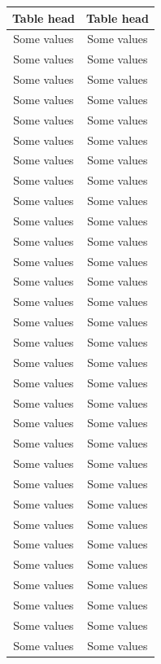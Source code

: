 \documentclass[11pt,a4paper]{article}
\begin{document}
\begin{minipage}{0.45\textwidth}
    \centering
    \begin{tabular}{cc}\hline
      Table head & Table head \\ \hline
        Some values & Some values \\
        Some values & Some values \\
        Some values & Some values \\
        Some values & Some values \\
        Some values & Some values \\
        Some values & Some values \\
        Some values & Some values \\
        Some values & Some values \\
        Some values & Some values \\
        Some values & Some values \\
        Some values & Some values \\
        Some values & Some values \\
        Some values & Some values \\
        Some values & Some values \\
        Some values & Some values \\
        Some values & Some values \\
        Some values & Some values \\
        Some values & Some values \\
        Some values & Some values \\
        Some values & Some values \\
        Some values & Some values \\
        Some values & Some values \\
        Some values & Some values \\
        Some values & Some values \\
        Some values & Some values \\
        Some values & Some values \\
        Some values & Some values \\
        Some values & Some values \\
        Some values & Some values \\
        Some values & Some values \\
        Some values & Some values \\

\end{tabular}
\end{minipage}
\end{document}
